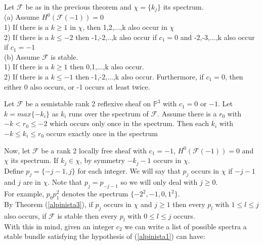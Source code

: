 \documentclass[
	oldfontcommands,
	sumario=abnt-6027-2012,
	12pt,			%
	openright,		%
	oneside,		%
	a4paper,		%
	english,		%
	brazil			%
	]{imecc-unicamp}
\begin{document}
\begin{theorem}\cite[Hartshorne, Theorem 7.5]{Hartshorne1980}\label{alpinista3}
Let $\mathcal{F}$ be as in the previous theorem and $\chi = \{k_j \}$ its spectrum. \\
(a) Assume $H^0 (\mathcal{F}(-1))=0$ \\
1) If there is a $k \geq 1$ in $\chi$, then 1,2,...,k also occur in $\chi$ \\
2) If there is a $k \leq -2$ then -1,-2,..,k also occur if $c_1=0$ and -2,-3,...,k also occur if $c_1=-1$ \\
(b) Assume $\mathcal{F}$ is stable. \\
1) If there is a $k \geq 1$ then 0,1,...,k also occur. \\
2) If there is a $k \leq -1$ then -1,-2,...,k also occur. Furthermore, if $c_1 =0$, then either 0 also occurs, or -1 occurs at least twice. 
\end{theorem}
\begin{proposition}\cite[Hartshorne, Proposition 5.1]{Hartshorne1980}\label{alpinista4}
Let $\mathcal{F}$ be a semistable rank 2 reflexive sheaf on $\mathbb{P}^3$ with $c_1=0$ or $-1$. Let $k= max \{-k_i \}$ as $k_i$ runs over the spectrum of $\mathcal{F}$. Assume there is a $r_0$ with $-k < r_0 \leq -2$ which occurs only once in the spectrum. Then each $k_i$ with $-k \leq k_i \leq r_0$ occurs exactly once in the spectrum
\end{proposition}
Now, let $\mathcal{F}$ be a rank 2 locally free sheaf with $c_1=-1$, $H^0(\mathcal{F}(-1))=0$ and $\chi$ its spectrum. If $k_j \in \chi$, by symmetry $-k_j -1 $ occurs in $\chi$. \\
Define $p_j=\{-j-1,j\}$ for each integer. We will say that $p_j$ occurs in $\chi$ if $-j-1$ and $j$ are in $\chi$. Note that $p_j = p_{-j-1}$ so we will only deal with $j \geq 0$. \\
For example, $p_0 p_1^2$ denotes the spectrum $\{-2^2,-1,0,1^2  \}$.\\
By Theorem (\ref{alpinista3}), if $p_j$ occurs in $\chi$ and $j \geq 1$ then every $p_l$ with $1 \leq l \leq j$ also occurs, if $\mathcal{F}$ is stable then every $p_l$ with $0 \leq l \leq j$ occurs. \\
With this in mind, given an integer $c_2$ we can write a list of possible spectra a stable bundle satisfying the hypothesis of (\ref{alpinista1}) can have:
\end{document}
